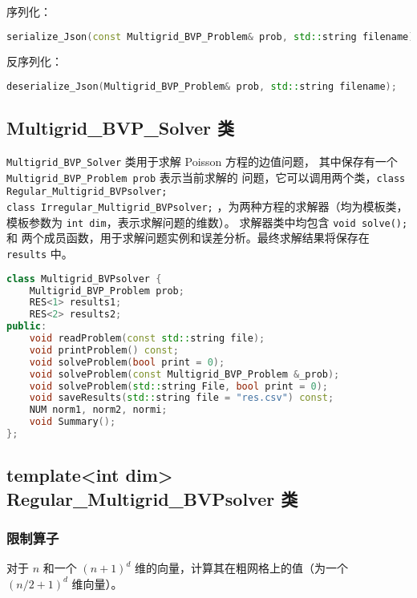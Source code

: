 \documentclass[lang=cn,a4paper,newtx,bibend=bibtex]{elegantpaper}
\begin{document}
序列化：

\begin{lstlisting}[language = C++]
  serialize_Json(const Multigrid_BVP_Problem& prob, std::string filename);
\end{lstlisting}

反序列化：

\begin{lstlisting}[language = C++]
  deserialize_Json(Multigrid_BVP_Problem& prob, std::string filename);
\end{lstlisting}

\subsection{Multigrid\_BVP\_Solver 类}

\texttt{Multigrid\_BVP\_Solver} 类用于求解 Poisson 方程的边值问题，
其中保存有一个 \texttt{Multigrid\_BVP\_Problem prob} 表示当前求解的
问题，它可以调用两个类，\texttt{class Regular\_Multigrid\_BVPsolver;\\
class Irregular\_Multigrid\_BVPsolver;} ，为两种方程的求解器（均为模板类，
模板参数为 \texttt{int dim}，表示求解问题的维数）。
求解器类中均包含 \texttt{void solve();} 和 
两个成员函数，用于求解问题实例和误差分析。最终求解结果将保存在 \lstinline{results} 中。

\begin{lstlisting}[language = C++]
  class Multigrid_BVPsolver {
    Multigrid_BVP_Problem prob;
    RES<1> results1;
    RES<2> results2;
public:
    void readProblem(const std::string file);
    void printProblem() const;
    void solveProblem(bool print = 0);
    void solveProblem(const Multigrid_BVP_Problem &_prob);
    void solveProblem(std::string File, bool print = 0);
    void saveResults(std::string file = "res.csv") const;
    NUM norm1, norm2, normi;
    void Summary();
};
\end{lstlisting}

\subsection{template<int dim> Regular\_Multigrid\_BVPsolver 类}

\subsubsection{限制算子}

对于 $n$ 和一个 $(n+1)^d$ 维的向量，计算其在粗网格上的值（为一个 $(n/2+1)^d$ 维向量）。
\end{document}
